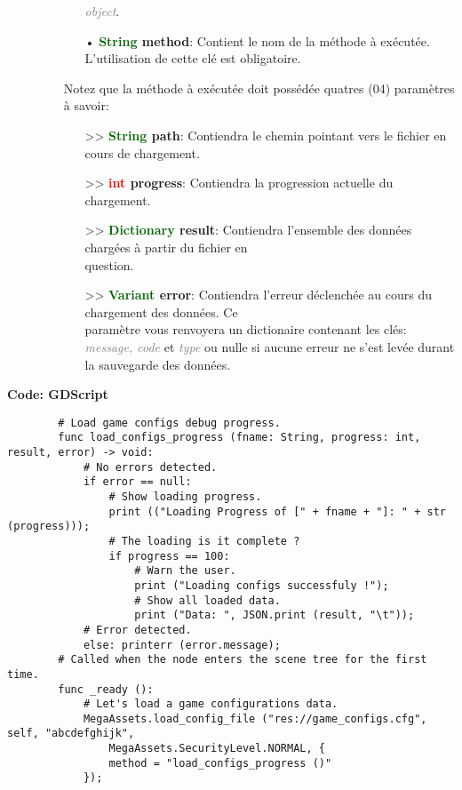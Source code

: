 \documentclass[a4paper, 11pt]{article}
\begin{document}
\begin{description}
\begin{itemize}
\begin{itemize}
			   \textit{\textcolor{gray}{object}}.
			   \item[• \textbf{\textcolor{darkgreen}{String} method}:] Contient le nom de la méthode à 
			   exécutée. L'utilisation de cette clé est obligatoire.
			\end{itemize}
			Notez que la méthode à exécutée doit possédée quatres (04) paramètres à savoir:
			\begin{itemize}
				\item [>> \textbf{\textcolor{darkgreen}{String} path}:] Contiendra le chemin pointant vers
				le fichier en cours de chargement.
				\item [>> \textbf{\textcolor{red}{int} progress}:] Contiendra la progression actuelle du
				chargement.
				\item [>> \textbf{\textcolor{darkgreen}{Dictionary} result}:] Contiendra l'ensemble des
				données chargées à partir du fichier en \\question.
				\item [>> \textbf{\textcolor{darkgreen}{Variant} error}:] Contiendra l'erreur déclenchée au
				cours du chargement des données. Ce \\paramètre vous renvoyera un dictionaire contenant les
				clés: \textit{\textcolor{gray}{message, code}} et \textit{\textcolor{gray}{type}} ou nulle
				si aucune erreur ne s'est levée durant la sauvegarde des données.\\
			\end{itemize}
		\end{itemize}
	\end{description}
	\newpage \textbf{Code: GDScript}
	\begin{lstlisting}
		# Load game configs debug progress.
		func load_configs_progress (fname: String, progress: int, result, error) -> void:
			# No errors detected.
			if error == null:
				# Show loading progress.
				print (("Loading Progress of [" + fname + "]: " + str (progress)));
				# The loading is it complete ?
				if progress == 100:
					# Warn the user.
					print ("Loading configs successfuly !");
					# Show all loaded data.
					print ("Data: ", JSON.print (result, "\t"));
			# Error detected.
			else: printerr (error.message);
		# Called when the node enters the scene tree for the first time.
		func _ready ():
			# Let's load a game configurations data.
			MegaAssets.load_config_file ("res://game_configs.cfg", self, "abcdefghijk", 			
				MegaAssets.SecurityLevel.NORMAL, {
				method = "load_configs_progress ()"
			});
	\end{lstlisting}
\end{document}
